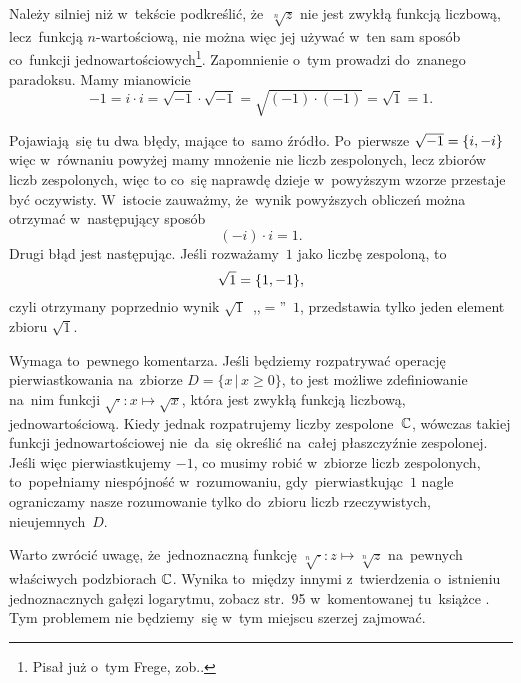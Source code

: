 \documentclass[a4paper,11pt]{article}
\begin{document}
\start {} Należy silniej niż w~tekście podkreślić,
że~$\sqrt[n]{ z }$ nie jest zwykłą funkcją liczbową, lecz~funkcją
$n$-wartościową, nie można więc jej używać w~ten sam sposób co~funkcji
jednowartościowych\footnote{Pisał już o~tym Frege,
  zob..}. Zapomnienie o~tym prowadzi do~znanego
paradoksu. Mamy mianowicie
\begin{equation}
  \label{eq:Leja-08}
  -1 = i \cdot i = \sqrt{ -1 } \cdot \sqrt{ -1 }
  = \sqrt{ ( -1 ) \cdot ( -1 ) } = \sqrt{ 1 } = 1.
\end{equation}

Pojawiają~się tu dwa błędy, mające to~samo źródło. Po~pierwsze
$\sqrt{ -1 } = \{  i, -i  \}$ więc w~równaniu powyżej mamy mnożenie
nie liczb zespolonych, lecz zbiorów liczb zespolonych, więc to co~się
naprawdę dzieje w~powyższym wzorze przestaje być oczywisty. W~istocie
zauważmy, że~wynik powyższych obliczeń można otrzymać w~następujący
sposób
\begin{equation}
  \label{eq:Leja-09}
  ( -i ) \cdot i = 1.
\end{equation}
Drugi błąd jest następując. Jeśli rozważamy~$1$ jako liczbę zespoloną,
to
\begin{equation}
  \label{eq:Leja-10}
  \sqrt{ 1 } = \{  1, -1  \},
\end{equation}
czyli otrzymany poprzednio wynik $\sqrt{ 1 }$~,,$=$''~$1$, przedstawia
tylko jeden element zbioru $\sqrt{ 1 }$.

Wymaga to~pewnego komentarza. Jeśli będziemy rozpatrywać operację
pierwiastkowania na~zbiorze $D = \{ x \, | \, x \geq 0 \}$, to jest
możliwe zdefiniowanie na~nim funkcji
$\sqrt{ \cdot }: x \mapsto \sqrt{ x }$, która jest zwykłą funkcją
liczbową, jednowartościową. Kiedy jednak rozpatrujemy liczby
zespolone~$\mathbb{C}$, wówczas takiej funkcji jednowartościowej nie~da~się
określić na~całej płaszczyźnie zespolonej. Jeśli więc pierwiastkujemy
$-1$, co musimy robić w~zbiorze liczb zespolonych, to~popełniamy
niespójność w~rozumowaniu, gdy~pierwiastkując~$1$ nagle ograniczamy
nasze rozumowanie tylko do~zbioru liczb rzeczywistych,
nieujemnych~$D$.

Warto zwrócić uwagę, że~jednoznaczną funkcję
$\sqrt[ n ]{ \cdot }: z \mapsto \sqrt[ n ]{ z }$ na~pewnych właściwych
podzbiorach $\mathbb{C}$. Wynika to~między innymi z~twierdzenia o~istnieniu
jednoznacznych gałęzi logarytmu, zobacz str.~95 w~komentowanej
tu~książce \cite{LejaFunkcjeZespolone2006}. Tym problemem nie
będziemy~się w~tym miejscu szerzej zajmować.

\vspace{\spaceFour}
\end{document}
